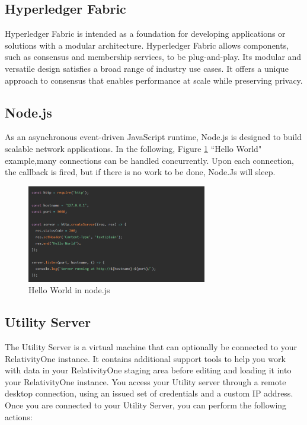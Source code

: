 \documentclass[a4paper,12pt]{report}
\begin{document}
\subsection{Hyperledger Fabric}
Hyperledger Fabric is intended as a foundation for developing applications or solutions with a modular architecture. Hyperledger Fabric allows components, such as consensus and membership services, to be plug-and-play. Its modular and versatile design satisfies a broad range of industry use cases. It offers a unique approach to consensus that enables performance at scale while preserving privacy\cite{fabric1}.
\subsection{Node.js}
As an asynchronous event-driven JavaScript runtime, Node.js is designed to build scalable network applications. In the following, Figure \ref{fig:node} ``Hello World" example,many connections can be handled concurrently. Upon each connection, the callback is fired, but if there is no work to be done, Node.Js will sleep.

\begin{figure}[h]
    \centering
    \includegraphics[width=0.7\textwidth]{nodejs.pdf}
    \caption{Hello World in node.js}
    \label{fig:node}
\end{figure}
\subsection{Utility Server}
The Utility Server is a virtual machine that can optionally be connected to your RelativityOne instance. It contains additional support tools to help you work with data in your RelativityOne staging area before editing and loading it into your RelativityOne instance. You access your Utility server through a remote desktop connection, using an issued set of credentials and a custom IP address.\\
Once you are connected to your Utility Server, you can perform the following actions:
\end{document}
